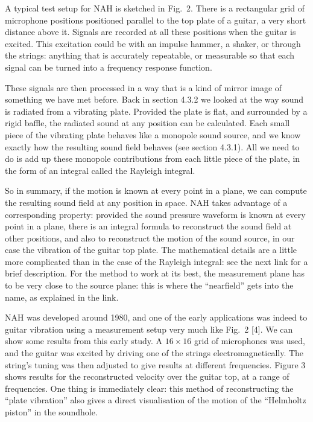   A typical test setup for NAH is sketched in Fig.\ 2. There is a rectangular 
  grid of microphone positions positioned parallel to the top plate of a 
  guitar, a very short distance above it. Signals are recorded at all these 
  positions when the guitar is excited. This excitation could be with an 
  impulse hammer, a shaker, or through the strings: anything that is accurately 
  repeatable, or measurable so that each signal can be turned into a frequency 
  response function. 

  These signals are then processed in a way that is a kind of mirror image of 
  something we have met before. Back in section 4.3.2 we looked at the way 
  sound is radiated from a vibrating plate. Provided the plate is flat, and 
  surrounded by a rigid baffle, the radiated sound at any position can be 
  calculated. Each small piece of the vibrating plate behaves like a monopole 
  sound source, and we know exactly how the resulting sound field behaves (see 
  section 4.3.1). All we need to do is add up these monopole contributions from 
  each little piece of the plate, in the form of an integral called the 
  Rayleigh integral. 

  So in summary, if the motion is known at every point in a plane, we can 
  compute the resulting sound field at any position in space. NAH takes 
  advantage of a corresponding property: provided the sound pressure waveform 
  is known at every point in a plane, there is an integral formula to 
  reconstruct the sound field at other positions, and also to reconstruct the 
  motion of the sound source, in our case the vibration of the guitar top 
  plate. The mathematical details are a little more complicated than in the 
  case of the Rayleigh integral: see the next link for a brief description. For 
  the method to work at its best, the measurement plane has to be very close to 
  the source plane: this is where the “nearfield” gets into the name, as 
  explained in the link. 

  NAH was developed around 1980, and one of the early applications was indeed 
  to guitar vibration using a measurement setup very much like Fig.\ 2 [4]. We 
  can show some results from this early study. A $16 \times 16$ grid of 
  microphones was used, and the guitar was excited by driving one of the 
  strings electromagnetically. The string’s tuning was then adjusted to give 
  results at different frequencies. Figure 3 shows results for the 
  reconstructed velocity over the guitar top, at a range of frequencies. One 
  thing is immediately clear: this method of reconstructing the “plate 
  vibration” also gives a direct visualisation of the motion of the “Helmholtz 
  piston” in the soundhole. 

